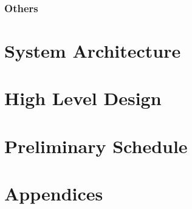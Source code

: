 \documentclass[a4paper,12pt]{article}
\begin{document}
\subsubsection{Others}

\section{System Architecture}
\section{High Level Design}
\section{Preliminary Schedule}
\section{Appendices}


\newpage
\theendnotes
\end{document}
